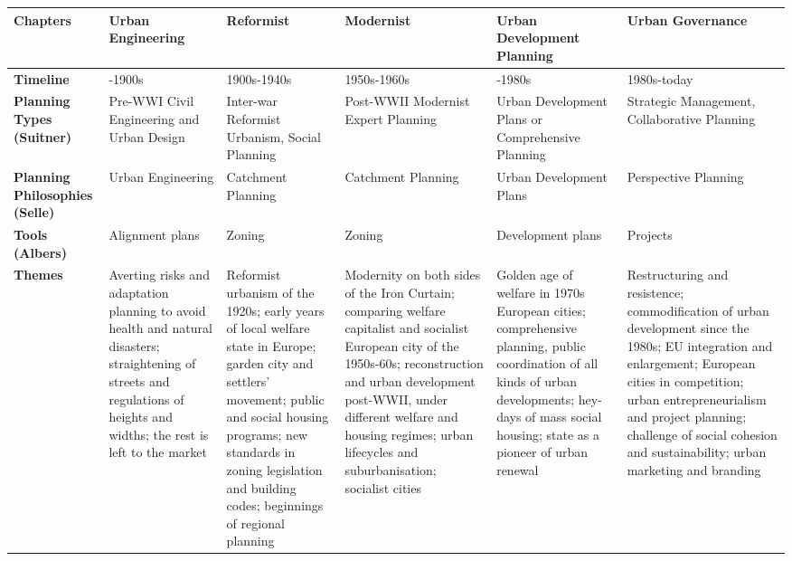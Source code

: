 \documentclass{article}
\begin{document}
{
\begin{tabularx}{1.15\textwidth} { 
  | >{\raggedright\arraybackslash}X
  | >{\raggedright\arraybackslash}X 
  | >{\raggedright\arraybackslash}X 
  | >{\raggedright\arraybackslash}X
  | >{\raggedright\arraybackslash}X 
  | >{\raggedright\arraybackslash}X | }
  \hline
  Chapters
  & \textbf{Urban Engineering}
   & \textbf{Reformist} 
   & \textbf{Modernist} 
   & \textbf{Urban Development Planning}
   & \textbf{Urban Governance} \\
  \hline
  \textbf{Timeline}
  & 1860-1900s
  & 1900s-1940s
  & 1950s-1960s
  & 1960-1980s
  & 1980s-today \\ 
  \hline
  \textbf{Planning Types (Suitner)}
  & Pre-WWI Civil Engineering and Urban Design
   & Inter-war Reformist Urbanism, Social Planning
   & Post-WWII Modernist Expert Planning
   & Urban Development Plans or Comprehensive Planning
   & Strategic Management, Collaborative Planning \\
  \hline
  \textbf{Planning Philosophies (Selle)}
   & Urban Engineering
   & Catchment Planning
   & Catchment Planning
   & Urban Development Plans
   & Perspective Planning \\
      \hline
  \textbf{Tools (Albers)}
  & Alignment plans
  & Zoning
  & Zoning
  & Development plans
  & Projects \\
      \hline
  \textbf{Themes}
  &  Averting risks and adaptation planning to avoid health and natural disasters; straightening of streets and regulations of heights and widths; the rest is left to the market
   & Reformist urbanism of the 1920s; early years of local welfare state in Europe; garden city and settlers' movement; public and social housing programs; new standards in zoning legislation and building codes; beginnings of regional planning 
   & Modernity on both sides of the Iron Curtain; comparing welfare capitalist and socialist European city of the 1950s-60s; reconstruction and urban development post-WWII, under different welfare and housing regimes; urban lifecycles and suburbanisation; socialist cities
   & Golden age of welfare in 1970s European cities; comprehensive planning, public coordination of all kinds of urban developments; hey-days of mass social housing; state as a pioneer of urban renewal
   & Restructuring and resistence; commodification of urban development since the 1980s; EU integration and enlargement; European cities in competition; urban entrepreneurialism and project planning; challenge of social cohesion and sustainability; urban marketing and branding \\

\end{tabularx}}
\end{document}

